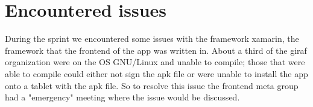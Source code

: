 \section{Encountered issues}
During the sprint we encountered some issues with the framework xamarin, the framework that the frontend of the app was written in. 
About a third of the giraf organization were on the OS GNU/Linux and unable to compile; those that were able to compile could either not sign the apk file or were unable to install the app onto a tablet with the apk file.
So to resolve this issue the frontend meta group had a "emergency" meeting where the issue would be discussed.

